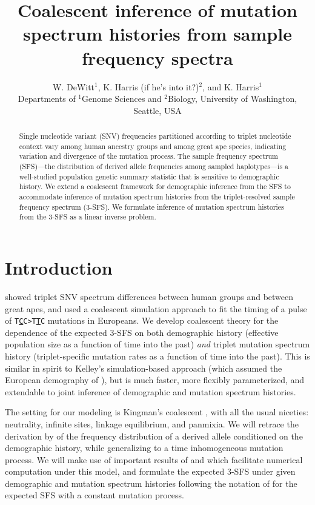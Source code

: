 \documentclass[11pt]{article}
\title{Coalescent inference of mutation spectrum histories from sample frequency spectra}
\author{
W. DeWitt$^{1}$, K. Harris (if he's into it?)$^{2}$, and K. Harris$^{1}$\\
\small{Departments of $^1$Genome Sciences and $^2$Biology, University of Washington, Seattle, USA}
}
\begin{document}
\maketitle

\begin{abstract}

Single nucleotide variant (SNV) frequencies partitioned according to triplet nucleotide context vary among human ancestry groups and among great ape species, indicating variation and divergence of the mutation process.
The sample frequency spectrum (SFS)---the distribution of derived allele frequencies among sampled haplotypes---is a well-studied population genetic summary statistic that is sensitive to demographic history.
We extend a coalescent framework for demographic inference from the SFS to accommodate inference of mutation spectrum histories from the triplet-resolved sample frequency spectrum (3-SFS).
We formulate inference of mutation spectrum histories from the 3-SFS as a linear inverse problem.

\end{abstract}


\section*{Introduction}\label{sec:intro}

\cite{Harris2017-fw} showed triplet SNV spectrum differences between human groups and between great apes, and used a coalescent simulation approach to fit the timing of a pulse of \texttt{T\underline{C}C>T\underline{T}C} mutations in Europeans.
We develop coalescent theory for the dependence of the expected 3-SFS on both demographic history (effective population size as a function of time into the past) \emph{and} triplet mutation spectrum history (triplet-specific mutation rates as a function of time into the past).
This is similar in spirit to Kelley's simulation-based approach (which assumed the European demography of \cite{Tennessen2012-dq}), but is much faster, more flexibly parameterized, and extendable to joint inference of demographic and mutation spectrum histories.

The setting for our modeling is Kingman's coalescent \citep{Kingman1982-ge, Kingman1982-tf, Kingman1982-ys, Kingman2000-jr}, with all the usual niceties: neutrality, infinite sites, linkage equilibrium, and panmixia.
We will retrace the derivation by \cite{Griffiths1998-qf} of the frequency distribution of a derived allele conditioned on the demographic history, while generalizing to a time inhomogeneous mutation process.
We will make use of important results of \cite{Polanski2003-kg} and \cite{Polanski2003-ll} which facilitate numerical computation under this model, and formulate the expected 3-SFS under given demographic and mutation spectrum histories following the notation of \cite{Rosen2018-bb} for the expected SFS with a constant mutation process.
\end{document}
